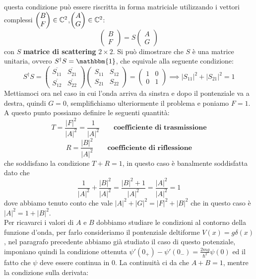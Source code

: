 questa condizione può essere riscritta in forma matriciale utilizzando i vettori complessi $\begin{pmatrix}
  B\\
  F
 \end{pmatrix}\in\mathbb{C}^2$,$\begin{pmatrix}
  A\\
  G
 \end{pmatrix}\in\mathbb{C}^2$:
\[ \begin{pmatrix}
  B\\
  F
 \end{pmatrix} = S \begin{pmatrix}
  A\\
  G
 \end{pmatrix} \]
 con $S$ \textbf{matrice di scattering} $2\times2$. Si può dimostrare che $S$ è una matrice unitaria, ovvero $S^\dagger S = \mathbbm{1}$, che equivale alla seguente condizione:
 \[S^\dagger S = \begin{pmatrix}
  \overline{S_{11}} & \overline{S_{21}} \\
   \overline{S_{12}} & \overline{S_{22}} 
 \end{pmatrix}\begin{pmatrix}
  S_{11} & S_{12}\\
   S_{21} & S_{22} 
 \end{pmatrix} = \begin{pmatrix}
 1 & 0\\
 0 & 1\end{pmatrix} \implies |S_{11}|^2 + |S_{21}|^2 = 1\]
 Mettiamoci ora nel caso in cui l'onda arriva da sinstra e dopo il pontenziale va a destra, quindi $G = 0$, semplifichiamo ulteriormente il problema e poniamo $F=1$. A questo punto possiamo definire le seguenti quantità:
 \[T = \frac{|F|^2}{|A|^2} = \frac{1}{|A|^2} \qquad \textbf{coefficiente di trasmissione}\]
 \[R = \frac{|B|^2}{|A|^2}  \qquad \textbf{coefficiente di riflessione}\]
 che soddisfano la condizione $T+R = 1$, in questo caso è banalmente soddisfatta dato che	
 \[ \frac{1}{|A|^2} + \frac{|B|^2}{|A|^2} = \frac{|B|^2 + 1}{|A|^2} = \frac{|A|^2}{|A|^2} = 1\]
 dove abbiamo tenuto conto che vale $|A|^2+|G|^2 = |F|^2 + |B|^2$ che in questo caso è $|A|^2 = 1 + |B|^2$.\\
 Per ricavarci i valori di $A$ e $B$ dobbiamo studiare le condizioni al contorno della funzione d'onda, per farlo consideriamo il pontenziale deltiforme $V(x) = g\delta(x)$, nel paragrafo precedente abbiamo già studiato il caso di questo potenziale, imponiano quindi la condizione ottenuta $\psi'(0_+) - \psi'(0_-) = \frac{2mg}{\hbar^2}\psi(0)$ ed il fatto che $\psi$ deve essere continua in 0. La continuità ci da che $A+B=1$, mentre la condizione sulla derivata:

